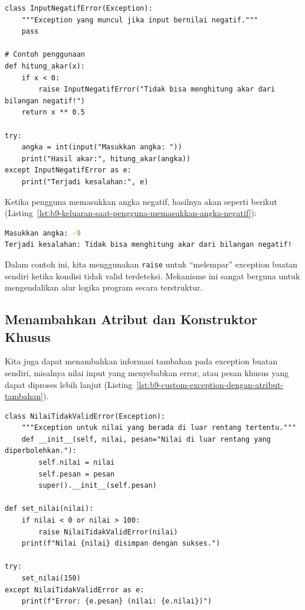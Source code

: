 \begin{lstlisting}[style=PythonStyle, caption={Contoh mendefinisikan custom exception sederhana}, label={lst:b9-mendefinisikan-custom-exception-sederhana}]
class InputNegatifError(Exception):
    """Exception yang muncul jika input bernilai negatif."""
    pass

# Contoh penggunaan
def hitung_akar(x):
    if x < 0:
        raise InputNegatifError("Tidak bisa menghitung akar dari bilangan negatif!")
    return x ** 0.5

try:
    angka = int(input("Masukkan angka: "))
    print("Hasil akar:", hitung_akar(angka))
except InputNegatifError as e:
    print("Terjadi kesalahan:", e)
\end{lstlisting}

Ketika pengguna memasukkan angka negatif, hasilnya akan seperti berikut (Listing~\ref{lst:b9-keluaran-saat-pengguna-memasukkan-angka-negatif}):

\begin{lstlisting}[language=bash, caption={Keluaran saat pengguna memasukkan angka negatif}, label={lst:b9-keluaran-saat-pengguna-memasukkan-angka-negatif}]
Masukkan angka: -9
Terjadi kesalahan: Tidak bisa menghitung akar dari bilangan negatif!
\end{lstlisting}

Dalam contoh ini, kita menggunakan \texttt{raise} untuk “melempar” exception buatan sendiri ketika kondisi tidak valid terdeteksi.  
Mekanisme ini sangat berguna untuk mengendalikan alur logika program secara terstruktur.

\subsection*{Menambahkan Atribut dan Konstruktor Khusus}

Kita juga dapat menambahkan informasi tambahan pada exception buatan sendiri, misalnya nilai input yang menyebabkan error, atau pesan khusus yang dapat diproses lebih lanjut (Listing~\ref{lst:b9-custom-exception-dengan-atribut-tambahan}).

\begin{lstlisting}[style=PythonStyle, caption={Custom exception dengan atribut tambahan}, label={lst:b9-custom-exception-dengan-atribut-tambahan}]
class NilaiTidakValidError(Exception):
    """Exception untuk nilai yang berada di luar rentang tertentu."""
    def __init__(self, nilai, pesan="Nilai di luar rentang yang diperbolehkan."):
        self.nilai = nilai
        self.pesan = pesan
        super().__init__(self.pesan)

def set_nilai(nilai):
    if nilai < 0 or nilai > 100:
        raise NilaiTidakValidError(nilai)
    print(f"Nilai {nilai} disimpan dengan sukses.")

try:
    set_nilai(150)
except NilaiTidakValidError as e:
    print(f"Error: {e.pesan} (nilai: {e.nilai})")
\end{lstlisting}

